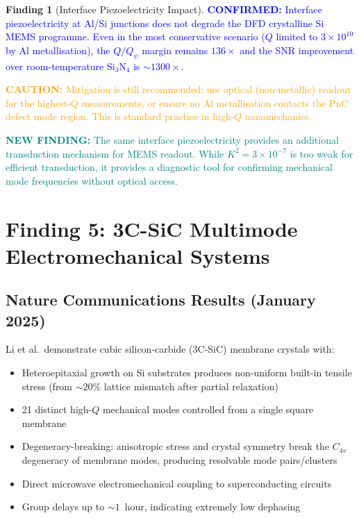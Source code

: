 \documentclass[11pt]{article}
\theoremstyle{definition}
\newtheorem{finding}[theorem]{Finding}
\theoremstyle{remark}
\newcommand{\ee}[1]{\times 10^{#1}}
\newcommand{\Qpsi}{Q_\psi}
\newcommand{\confirmed}[1]{\textcolor{blue}{\textbf{CONFIRMED:} #1}}
\newcommand{\caution}[1]{\textcolor{orange}{\textbf{CAUTION:} #1}}
\newcommand{\newfinding}[1]{\textcolor{teal}{\textbf{NEW FINDING:} #1}}
\begin{document}
\begin{finding}[Interface Piezoelectricity Impact]
\label{find:interface_piezo}
\confirmed{Interface piezoelectricity at Al/Si junctions does not
degrade the DFD crystalline Si MEMS programme. Even in the most
conservative scenario ($Q$ limited to $3\ee{10}$ by Al metallisation),
the $Q/\Qpsi$ margin remains $136\times$ and the SNR improvement
over room-temperature Si$_3$N$_4$ is $\sim 1300\times$.}

\caution{Mitigation is still recommended: use optical (non-metallic)
readout for the highest-$Q$ measurements, or ensure no Al metallisation
contacts the PnC defect mode region. This is standard practice in
high-$Q$ nanomechanics.}

\newfinding{The same interface piezoelectricity provides an additional
transduction mechanism for MEMS readout. While $K^2 = 3\ee{-7}$ is
too weak for efficient transduction, it provides a diagnostic tool
for confirming mechanical mode frequencies without optical access.}
\end{finding}


\section{Finding 5: 3C-SiC Multimode Electromechanical Systems}
\label{sec:3c_sic}

\subsection{Nature Communications Results (January 2025)}

Li et al.\ demonstrate cubic silicon-carbide (3C-SiC) membrane
crystals with:

\begin{itemize}[nosep]
\item Heteroepitaxial growth on Si substrates produces non-uniform
  built-in tensile stress (from $\sim 20\%$ lattice mismatch after
  partial relaxation)
\item 21 distinct high-$Q$ mechanical modes controlled from a single
  square membrane
\item Degeneracy-breaking: anisotropic stress and crystal symmetry
  break the $C_{4v}$ degeneracy of membrane modes, producing
  resolvable mode pairs/clusters
\item Direct microwave electromechanical coupling to superconducting
  circuits
\item Group delays up to $\sim 1$~hour, indicating extremely low
  dephasing
\end{itemize}
\end{document}
